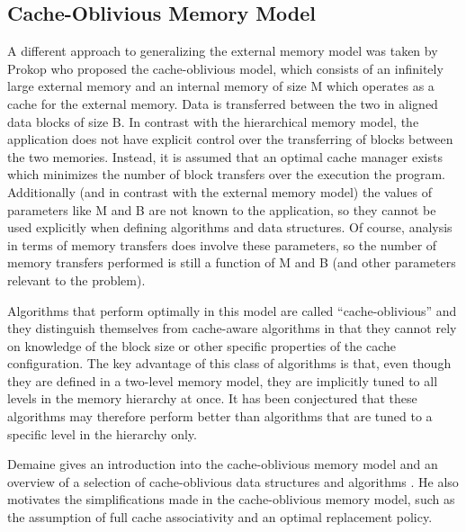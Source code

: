 \documentclass{acm_proc_article-sp}
\begin{document}
\subsection{Cache-Oblivious Memory Model}
A different approach to generalizing the external memory model was taken by Prokop \cite{prokop1999coa} who proposed the cache-oblivious model, which consists of an infinitely large external memory and an internal memory of size M which operates as a cache for the external memory. Data is transferred between the two in aligned data blocks of size B. In contrast with the hierarchical memory model, the application does not have explicit control over the transferring of blocks between the two memories. Instead, it is assumed that an optimal cache manager exists which minimizes the number of block transfers over the execution the program. Additionally (and in contrast with the external memory model) the values of parameters like M and B are not known to the application, so they cannot be used explicitly when defining algorithms and data structures. Of course, analysis in terms of memory transfers does involve these parameters, so the number of memory transfers performed is still a function of M and B (and other parameters relevant to the problem).

Algorithms that perform optimally in this model are called ``cache-oblivious'' and they distinguish themselves from cache-aware algorithms in that they cannot rely on knowledge of the block size or other specific properties of the cache configuration. The key advantage of this class of algorithms is that, even though they are defined in a two-level memory model, they are implicitly tuned to all levels in the memory hierarchy at once. It has been conjectured that these algorithms may therefore perform better than algorithms that are tuned to a specific level in the hierarchy only.

Demaine gives an introduction into the cache-oblivious memory model and an overview of a selection of cache-oblivious data structures and algorithms \cite{demaine2002coa}. He also motivates the simplifications made in the cache-oblivious memory model, such as the assumption of full cache associativity and an optimal replacement policy.
\end{document}
